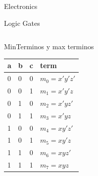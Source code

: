 \begin{section}{Electronics}
\begin{subsection}{Logic Gates}
\begin{tabular}{ |m{3cm}|m{3cm}|m{6cm}|  }
		\end{tabular}
	\end{subsection}
	\begin{subsection}{MinTerminos y max terminos}
		\begin{tabular}{ | m{1cm} m{1cm} m{1cm}| m{4cm} |  }
		\hline
			a & b & c & term \\
		\hline
		\hline
			0 & 0 & 0 & $m_0 = x'y'z'$ \\
			0 & 0 & 1 & $m_1 = x'y'z$ \\
			0 & 1 & 0 & $m_2 = x'yz'$ \\
			0 & 1 & 1 & $m_3 = x'yz$ \\
			1 & 0 & 0 & $m_4 = xy'z'$ \\
			1 & 0 & 1 & $m_5 = xy'z$ \\
			1 & 1 & 0 & $m_6 = xyz'$ \\
			1 & 1 & 1 & $m_7 = xyz$ \\
		\hline

		\end{tabular}
	\end{subsection}

\end{section}
